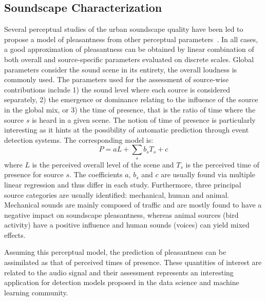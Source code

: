\documentclass{article}
\begin{document}
\begin{sloppy}
\section{Soundscape Characterization}
\label{sec:char}
Several perceptual studies of the urban soundscape quality have been led to propose a model of pleasantness from other perceptual parameters~\cite{nilsson2007, axelsson2010, aumond2017, ricciardi2014}. In all cases, a good approximation of pleasantness can be obtained by linear combination of both overall and source-specific parameters evaluated on discrete scales. Global parameters consider the sound scene in its entirety, the overall loudness is commonly used. The parameters used for the assessment of source-wise contributions include 1) the sound level where each source is considered separately, 2) the emergence or dominance relating to the influence of the source in the global mix, or 3) the time of presence, that is the ratio of time where the source $s$ is heard in a given scene. The notion of time of presence is particularly interesting as it hints at the possibility of automatic prediction through event detection systems. The corresponding model is:
\begin{equation}
P = aL + \sum_s b_sT_s + c
\end{equation}
where $L$ is the perceived overall level of the scene and $T_s$ is the perceived time of presence for source $s$. The coefficients $a$, $b_s$ and $c$ are usually found via multiple linear regression and thus differ in each study.
Furthermore, three principal source categories are usually identified: mechanical, human and animal. Mechanical sounds are mainly composed of traffic and are mostly found to have a negative impact on soundscape pleasantness, whereas animal sources (bird activity) have a positive influence and human sounds (voices) can yield mixed effects.

Assuming this perceptual model, the prediction of pleasantness can be assimilated as that of perceived times of presence. These quantities of interest are related to the audio signal and their assessment represents an interesting application for detection models proposed in the data science and machine learning community.


\end{sloppy}
\end{document}
